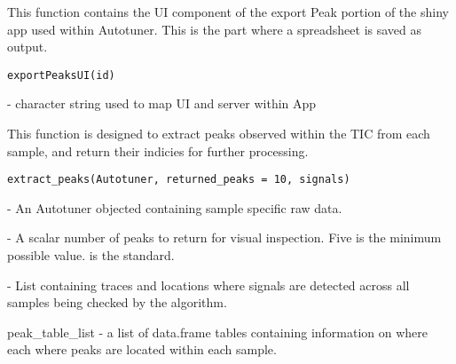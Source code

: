 \documentclass[a4paper]{book}
\begin{document}
%
\begin{Description}\relax
This function contains the UI component of the export Peak
portion of the shiny app used within Autotuner. This is the part where a
spreadsheet is saved as output.
\end{Description}
%
\begin{Usage}
\begin{verbatim}
exportPeaksUI(id)
\end{verbatim}
\end{Usage}
%
\begin{Arguments}
\begin{ldescription}
\item[\code{id}] - character string used to map UI and server within App
\end{ldescription}
\end{Arguments}
%
\begin{Description}\relax
This function is designed to extract peaks observed within the
TIC from each sample, and return their indicies for further processing.
\end{Description}
%
\begin{Usage}
\begin{verbatim}
extract_peaks(Autotuner, returned_peaks = 10, signals)
\end{verbatim}
\end{Usage}
%
\begin{Arguments}
\begin{ldescription}
\item[\code{Autotuner}] - An Autotuner objected containing sample specific raw
data.

\item[\code{returned\_peaks}] - A scalar number of peaks to return for visual
inspection. Five is the minimum possible value.
is the standard.

\item[\code{signals}] - List containing traces and locations where signals are
detected across all samples being checked by the algorithm.
\end{ldescription}
\end{Arguments}
%
\begin{Value}
peak\_table\_list - a list of data.frame tables containing information
on where each where peaks are located within each sample.
\end{Value}
\end{document}
